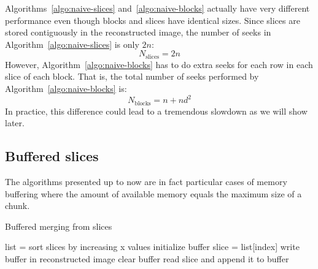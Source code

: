 \documentclass[10pt, conference, compsocconf]{IEEEtran}
\begin{document}
Algorithms~\ref{algo:naive-slices} and~\ref{algo:naive-blocks}
actually have very different performance even though blocks and slices
have identical sizes. Since slices are stored contiguously in the
reconstructed image, the number of seeks in
Algorithm~\ref{algo:naive-slices} is only $2n$:
\begin{equation}
  N_\mathrm{slices} = 2n 
\end{equation}
However,
Algorithm~\ref{algo:naive-blocks} has to do extra seeks for each row
in each slice of each block. That is, the total number of seeks
performed by Algorithm~\ref{algo:naive-blocks} is:
\begin{equation}
N_\mathrm{blocks} = n+nd^2 
\end{equation}
In
practice, this difference could lead to a tremendous slowdown as we will show
later.


\subsection{Buffered slices}

The algorithms presented up to now are in fact particular cases of
memory buffering where the amount of available memory equals the
maximum size of a chunk. 

\begin{algorithm}[h]
  \caption{Buffered merging from slices}
  \label{algo:buffered-slices}
  \begin{algorithmic}[1]
    \STATE list = sort slices by increasing x values
    \STATE initialize buffer
      \STATE slice = list[index]
        \STATE write buffer in reconstructed image
        \STATE clear buffer
      \ENDIF
      \STATE read slice and append it to buffer
    \ENDFOR
  \end{algorithmic}
\end{algorithm}
\end{document}
